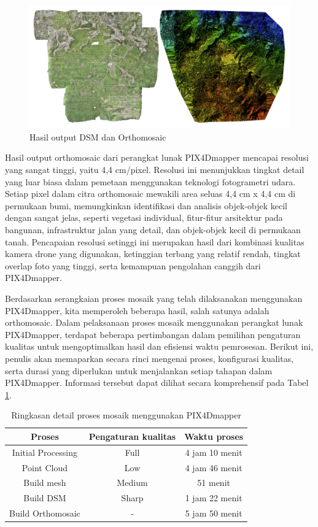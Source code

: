 \begin{figure} [H]
    \centering
    \includegraphics[width=1\linewidth]{image/DSM dan ortho.png}
    \caption{Hasil output DSM dan Orthomosaic}
    \label{dsm ortho}
\end{figure}

Hasil output orthomosaic dari perangkat lunak PIX4Dmapper mencapai resolusi yang sangat tinggi, yaitu 4,4 cm/pixel. Resolusi ini menunjukkan tingkat detail yang luar biasa dalam pemetaan menggunakan teknologi fotogrametri udara. Setiap pixel dalam citra orthomosaic mewakili area seluas 4,4 cm x 4,4 cm di permukaan bumi, memungkinkan identifikasi dan analisis objek-objek kecil dengan sangat jelas, seperti vegetasi individual, fitur-fitur arsitektur pada bangunan, infrastruktur jalan yang detail, dan objek-objek kecil di permukaan tanah. Pencapaian resolusi setinggi ini merupakan hasil dari kombinasi kualitas kamera drone yang digunakan, ketinggian terbang yang relatif rendah, tingkat overlap foto yang tinggi, serta kemampuan pengolahan canggih dari PIX4Dmapper. 

Berdasarkan serangkaian proses mosaik yang telah dilaksanakan menggunakan PIX4Dmapper, kita memperoleh beberapa hasil, salah satunya adalah orthomosaic. Dalam pelaksanaan proses mosaik menggunakan perangkat lunak PIX4Dmapper, terdapat beberapa pertimbangan dalam pemilihan pengaturan kualitas untuk mengoptimalkan hasil dan efisiensi waktu pemrosesan. Berikut ini, penulis akan memaparkan secara rinci mengenai proses, konfigurasi kualitas, serta durasi yang diperlukan untuk menjalankan setiap tahapan dalam PIX4Dmapper. Informasi tersebut dapat dilihat secara komprehensif pada Tabel \ref{runningpix}.

\begin{table}[h]
\centering
\caption{Ringkasan detail proses mosaik menggunakan PIX4Dmapper}
\begin{tabular}{|c|c|c|}
\hline
\textbf{Proses} & \textbf{Pengaturan kualitas} & \textbf{Waktu proses}\\
\hline
Initial Processing & Full & 4 jam 10 menit \\
\hline
Point Cloud & Low & 4 jam 46 menit \\
\hline
Build mesh & Medium & 51 menit \\
\hline
Build DSM & Sharp & 1 jam 22 menit \\
\hline
Build Orthomosaic & - & 5 jam 50 menit \\
\hline
\end{tabular}
\label{runningpix}
\end{table}

